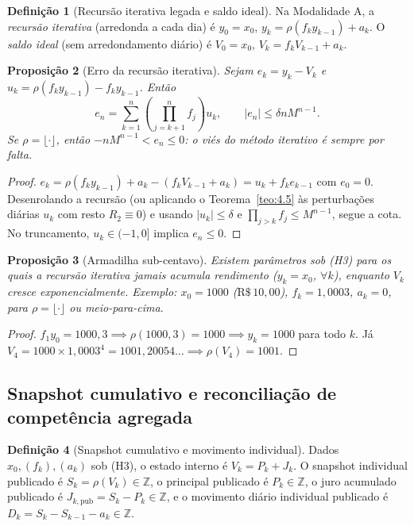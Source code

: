\documentclass[11pt, a4paper]{article}
\theoremstyle{definition}
\newtheorem{definicao}{Definição}[section]
\theoremstyle{plain}
\newtheorem{proposicao}[definicao]{Proposição}
\theoremstyle{remark}
\begin{document}
\begin{definicao}[Recursão iterativa legada e saldo ideal]\label{def:5.4}
Na Modalidade A, a \emph{recursão iterativa} (arredonda a cada dia) é $y_0 = x_0$, $y_k = \rho(f_k y_{k-1}) + a_k$. O \emph{saldo ideal} (sem arredondamento diário) é $V_0 = x_0$, $V_k = f_k V_{k-1} + a_k$.
\end{definicao}

\begin{proposicao}[Erro da recursão iterativa]\label{prop:5.5}
Sejam $e_k = y_k - V_k$ e $u_k = \rho(f_k y_{k-1}) - f_k y_{k-1}$. Então
\[
e_n = \sum_{k=1}^{n} \left(\prod_{j=k+1}^{n} f_j\right) u_k, \qquad |e_n| \le \delta n M^{n-1}.
\]
Se $\rho = \lfloor \cdot \rfloor$, então $-n M^{n-1} < e_n \le 0$: o viés do método iterativo é sempre por falta.
\end{proposicao}
\begin{proof}
$e_k = \rho(f_k y_{k-1}) + a_k - (f_k V_{k-1} + a_k) = u_k + f_k e_{k-1}$ com $e_0 = 0$. Desenrolando a recursão (ou aplicando o Teorema~\ref{teo:4.5} às perturbações diárias $u_k$ com resto $R_2 \equiv 0$) e usando $|u_k| \le \delta$ e $\prod_{j>k} f_j \le M^{n-1}$, segue a cota. No truncamento, $u_k \in (-1, 0]$ implica $e_n \le 0$.
\end{proof}

\begin{proposicao}[Armadilha sub-centavo]\label{prop:5.6}
Existem parâmetros sob (H3) para os quais a recursão iterativa jamais acumula rendimento ($y_k = x_0$, $\forall k$), enquanto $V_k$ cresce exponencialmente. Exemplo: $x_0 = 1000$ ($\text{R\$}\,10{,}00$), $f_k = 1{,}0003$, $a_k = 0$, para $\rho = \lfloor \cdot \rfloor$ ou meio-para-cima.
\end{proposicao}
\begin{proof}
$f_1 y_0 = 1000{,}3 \implies \rho(1000{,}3) = 1000 \implies y_k = 1000$ para todo $k$. Já $V_4 = 1000 \times 1{,}0003^4 = 1001{,}20054\dots \implies \rho(V_4) = 1001$.
\end{proof}

\subsection{Snapshot cumulativo e reconciliação de competência agregada}\label{sec:5.3}

\begin{definicao}[Snapshot cumulativo e movimento individual]\label{def:5.7}
Dados $x_0, (f_k), (a_k)$ sob (H3), o estado interno é $V_k = P_k + J_k$. O snapshot individual publicado é $S_k = \rho(V_k) \in \mathbb{Z}$, o principal publicado é $P_k \in \mathbb{Z}$, o juro acumulado publicado é $J_{k,\text{pub}} = S_k - P_k \in \mathbb{Z}$, e o movimento diário individual publicado é $D_k = S_k - S_{k-1} - a_k \in \mathbb{Z}$.
\end{definicao}
\end{document}
